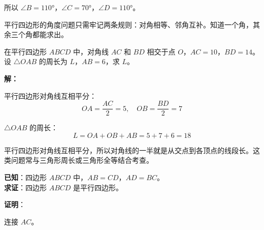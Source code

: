 \documentclass[12pt, a4paper]{ctexart}
\begin{document}
所以 $\angle B = 110°$，$\angle C = 70°$，$\angle D = 110°$。

\begin{tipbox}[方法总结]
平行四边形的角度问题只需牢记两条规则：对角相等、邻角互补。知道一个角，其余三个角都能求出。
\end{tipbox}

\vspace{6pt}

\begin{examplebox}
在平行四边形 $ABCD$ 中，对角线 $AC$ 和 $BD$ 相交于点 $O$，$AC = 10$，$BD = 14$。\\
设 $\triangle OAB$ 的周长为 $L$，$AB = 6$，求 $L$。
\end{examplebox}

\textbf{解：}

平行四边形对角线互相平分：
\[
OA = \frac{AC}{2} = 5, \quad OB = \frac{BD}{2} = 7
\]

$\triangle OAB$ 的周长：
\[
L = OA + OB + AB = 5 + 7 + 6 = 18
\]

\begin{tipbox}[方法总结]
平行四边形对角线互相平分，所以对角线的一半就是从交点到各顶点的线段长。这类问题常与三角形周长或三角形全等结合考查。
\end{tipbox}

\vspace{6pt}

\begin{examplebox}
\textbf{已知}：四边形 $ABCD$ 中，$AB = CD$，$AD = BC$。\\
\textbf{求证}：四边形 $ABCD$ 是平行四边形。

\begin{center}
\end{center}
\end{examplebox}

\textbf{证明}：

连接 $AC$。
\end{document}
